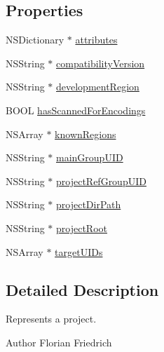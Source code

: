 \subsection*{Properties}
\begin{DoxyCompactItemize}
\item 
N\-S\-Dictionary $\ast$ \hyperlink{interface_f_f_x_c_project_a3d9174cba610fb35ea7ca328afe29149}{attributes}
\item 
N\-S\-String $\ast$ \hyperlink{interface_f_f_x_c_project_a0778f80dd66714ad94b18792dad005bc}{compatibility\-Version}
\item 
N\-S\-String $\ast$ \hyperlink{interface_f_f_x_c_project_aa081d75ef031c02b0ba9f653a4028c26}{development\-Region}
\item 
B\-O\-O\-L \hyperlink{interface_f_f_x_c_project_a0aa4bdd6f5fc15fec79751b719d54476}{has\-Scanned\-For\-Encodings}
\item 
N\-S\-Array $\ast$ \hyperlink{interface_f_f_x_c_project_a6ec43b9b918228add371b4e4786fa502}{known\-Regions}
\item 
N\-S\-String $\ast$ \hyperlink{interface_f_f_x_c_project_ac13e797d53235cb498c07537c392486b}{main\-Group\-U\-I\-D}
\item 
N\-S\-String $\ast$ \hyperlink{interface_f_f_x_c_project_a5926b13b772c262c8305679b69fbb619}{project\-Ref\-Group\-U\-I\-D}
\item 
N\-S\-String $\ast$ \hyperlink{interface_f_f_x_c_project_a49a09d8648a92fc54406764334483413}{project\-Dir\-Path}
\item 
N\-S\-String $\ast$ \hyperlink{interface_f_f_x_c_project_a8984593eb6669c3d57fa2921fd1b916e}{project\-Root}
\item 
N\-S\-Array $\ast$ \hyperlink{interface_f_f_x_c_project_a8d63eb24f67b51e1537f448f8c6b4974}{target\-U\-I\-Ds}
\end{DoxyCompactItemize}


\subsection{Detailed Description}
Represents a project. \begin{DoxyAuthor}{Author}
Florian Friedrich 
\end{DoxyAuthor}


